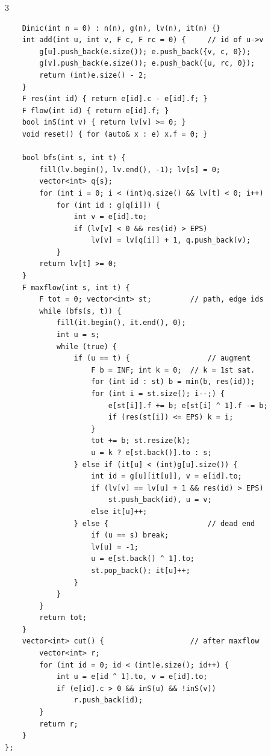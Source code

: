 \documentclass[9pt,a4paper]{extarticle}
\begin{document}
\begin{multicols*}{3}
\begin{lstlisting}
    Dinic(int n = 0) : n(n), g(n), lv(n), it(n) {}
    int add(int u, int v, F c, F rc = 0) {     // id of u->v
        g[u].push_back(e.size()); e.push_back({v, c, 0});
        g[v].push_back(e.size()); e.push_back({u, rc, 0});
        return (int)e.size() - 2;
    }
    F res(int id) { return e[id].c - e[id].f; }
    F flow(int id) { return e[id].f; }
    bool inS(int v) { return lv[v] >= 0; }
    void reset() { for (auto& x : e) x.f = 0; }

    bool bfs(int s, int t) {
        fill(lv.begin(), lv.end(), -1); lv[s] = 0;
        vector<int> q{s};
        for (int i = 0; i < (int)q.size() && lv[t] < 0; i++)
            for (int id : g[q[i]]) {
                int v = e[id].to;
                if (lv[v] < 0 && res(id) > EPS)
                    lv[v] = lv[q[i]] + 1, q.push_back(v);
            }
        return lv[t] >= 0;
    }
    F maxflow(int s, int t) {
        F tot = 0; vector<int> st;         // path, edge ids
        while (bfs(s, t)) {
            fill(it.begin(), it.end(), 0);
            int u = s;
            while (true) {
                if (u == t) {                  // augment
                    F b = INF; int k = 0;  // k = 1st sat.
                    for (int id : st) b = min(b, res(id));
                    for (int i = st.size(); i--;) {
                        e[st[i]].f += b; e[st[i] ^ 1].f -= b;
                        if (res(st[i]) <= EPS) k = i;
                    }
                    tot += b; st.resize(k);
                    u = k ? e[st.back()].to : s;
                } else if (it[u] < (int)g[u].size()) {
                    int id = g[u][it[u]], v = e[id].to;
                    if (lv[v] == lv[u] + 1 && res(id) > EPS)
                        st.push_back(id), u = v;
                    else it[u]++;
                } else {                       // dead end
                    if (u == s) break;
                    lv[u] = -1;
                    u = e[st.back() ^ 1].to;
                    st.pop_back(); it[u]++;
                }
            }
        }
        return tot;
    }
    vector<int> cut() {                    // after maxflow
        vector<int> r;
        for (int id = 0; id < (int)e.size(); id++) {
            int u = e[id ^ 1].to, v = e[id].to;
            if (e[id].c > 0 && inS(u) && !inS(v))
                r.push_back(id);
        }
        return r;
    }
};
\end{lstlisting}


\end{multicols*}
\end{document}
